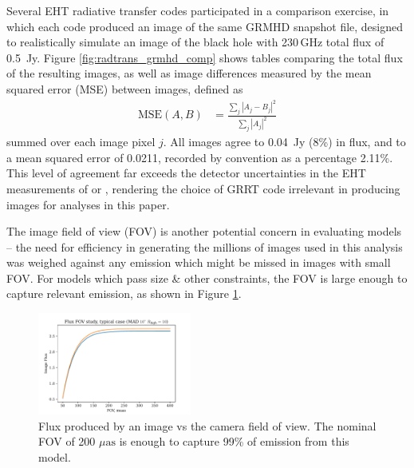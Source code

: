 Several EHT radiative transfer codes participated in a comparison exercise, in which each code produced an image of the same GRMHD snapshot file, designed to realistically simulate an image of the black hole  with 230\,GHz total flux of 0.5~Jy. Figure \ref{fig:radtrans_grmhd_comp} shows tables comparing the total flux of the resulting images, as well as image differences measured by the mean squared error (MSE) between images, defined as
\begin{align}
    \mathrm{MSE}(A, B) &= \frac{\sum_j|A_j-B_j|^2}{\sum_j|A_j|^2}
\end{align}
summed over each image pixel $j$. All images agree to 0.04~Jy (8\%) in flux, and to a mean squared error of 0.0211, recorded by convention as a percentage 2.11\%.  This level of agreement far exceeds the detector uncertainties in the EHT measurements of \sgra or , rendering the choice of GRRT code irrelevant in producing images for analyses in this paper.

The image field of view (FOV) is another potential concern in evaluating models -- the need for efficiency in generating the millions of images used in this analysis was weighed against any emission which might be missed in images with small FOV. For models which pass size \& other constraints, the FOV is large enough to capture relevant emission, as shown in Figure \ref{fig:radtrans_fov_study}.

\begin{figure}
  \centering
  \includegraphics[width=0.45\textwidth]{figures/fov_study.pdf}
  \caption{Flux produced by an image vs the camera field of view. The nominal FOV of 200 $\mu\mathrm{as}$ is enough to capture 99\% of emission from this model.}
  \label{fig:radtrans_fov_study}
\end{figure}


